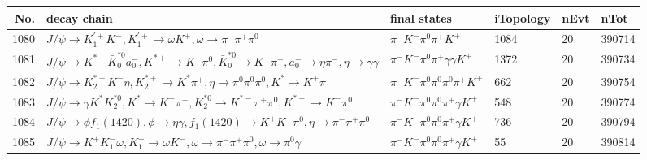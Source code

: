 \begin{table}[htbp] 
\begin{center}
\begin{small}
\begin{tabular}{rlllll}\hline\hline
 No. & decay chain & final states &  iTopology & nEvt & nTot \\\hline
1080&$J/\psi       \rightarrow K_1^{'+}      K^{-}          , K_1^{'+}       \rightarrow \omega         K^{+}          , \omega          \rightarrow \pi^{-}        \pi^{+}        \pi^{0}        $&$\pi^{-}        K^{-}          \pi^{0}        \pi^{+}        K^{+}          $& 1084&   20&390714\\
1081&$J/\psi       \rightarrow K^{*+}         \bar{K}_0^{*0}a_{0}^{-}      , K^{*+}          \rightarrow K^{+}          \pi^{0}        , \bar{K}_0^{*0} \rightarrow K^{-}          \pi^{+}        , a_{0}^{-}       \rightarrow \eta          \pi^{-}        , \eta           \rightarrow \gamma       \gamma       $&$\pi^{-}        K^{-}          \pi^{0}        \pi^{+}        \gamma       \gamma       K^{+}          $& 1372&   20&390734\\
1082&$J/\psi       \rightarrow K_2^{*+}       K^{-}          \eta          , K_2^{*+}        \rightarrow K^{*}          \pi^{+}        , \eta           \rightarrow \pi^{0}        \pi^{0}        \pi^{0}        , K^{*}           \rightarrow K^{+}          \pi^{-}        $&$\pi^{-}        K^{-}          \pi^{0}        \pi^{0}        \pi^{0}        \pi^{+}        K^{+}          $&  662&   20&390754\\
1083&$J/\psi       \rightarrow \gamma       K^{*}          K_2^{*0}       , K^{*}           \rightarrow K^{+}          \pi^{-}        , K_2^{*0}        \rightarrow K^{*-}         \pi^{+}        \pi^{0}        , K^{*-}          \rightarrow K^{-}          \pi^{0}        $&$\pi^{-}        K^{-}          \pi^{0}        \pi^{0}        \pi^{+}        \gamma       K^{+}          $&  548&   20&390774\\
1084&$J/\psi       \rightarrow \phi           f_{1}(1420)    , \phi            \rightarrow \eta          \gamma       , f_{1}(1420)     \rightarrow K^{+}          K^{-}          \pi^{0}        , \eta           \rightarrow \pi^{-}        \pi^{+}        \pi^{0}        $&$\pi^{-}        K^{-}          \pi^{0}        \pi^{0}        \pi^{+}        \gamma       K^{+}          $&  736&   20&390794\\
1085&$J/\psi       \rightarrow K^{+}          K_{1}^{-}      \omega         , K_{1}^{-}       \rightarrow \omega         K^{-}          , \omega          \rightarrow \pi^{-}        \pi^{+}        \pi^{0}        , \omega          \rightarrow \pi^{0}        \gamma       $&$\pi^{-}        K^{-}          \pi^{0}        \pi^{0}        \pi^{+}        \gamma       K^{+}          $&   55&   20&390814\\

\end{tabular}
\end{small}
\end{center}
\end{table}
